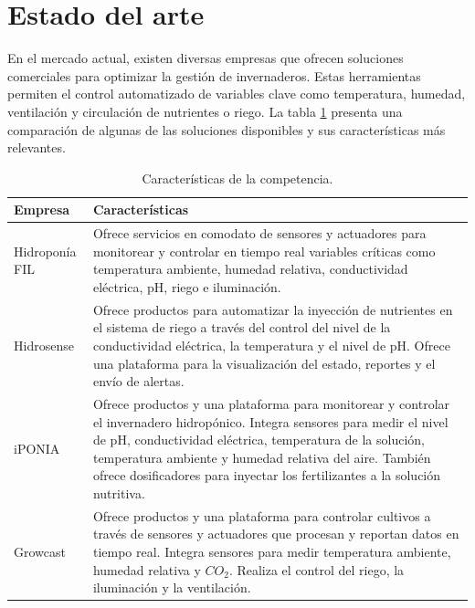 
\section{Estado del arte}

En el mercado actual, existen diversas empresas que ofrecen soluciones
comerciales para optimizar la gestión de invernaderos. Estas herramientas
permiten el control automatizado de variables clave como temperatura, humedad,
ventilación y circulación de nutrientes o riego. La tabla \ref{tab:competencia}
presenta una comparación de algunas de las soluciones disponibles y sus
características más relevantes.

\begin{table}[h]
      \centering
      \caption[Características de la competencia.]{Características de la competencia.}
      \begin{tabular}{p{3.2cm}p{9.6cm}}
            \toprule
            \textbf{Empresa}                                     & \textbf{Características}                                                         \\
            \midrule
            \multirow{1}{*}{Hidroponía FIL \cite{HidroponiaFIL}} & Ofrece servicios en comodato de sensores y actuadores
            para monitorear y controlar en tiempo real variables críticas como temperatura ambiente, humedad relativa, conductividad
            eléctrica, pH, riego e iluminación.                                                                                                     \\
            \multirow{1}{*}{Hidrosense \cite{Hidrosense}}        & Ofrece productos para automatizar la inyección de nutrientes en el sistema
            de riego a través del control del nivel de la conductividad eléctrica, la temperatura y el nivel de pH. Ofrece una plataforma para la
            visualización del estado, reportes y el envío de alertas.                                                                               \\
            \multirow{1}{*}{iPONIA \cite{iPonia}}                & Ofrece productos y una plataforma para monitorear y controlar el invernadero
            hidropónico. Integra sensores para medir el nivel de pH, conductividad eléctrica, temperatura de la solución, temperatura ambiente
            y humedad relativa del aire. También ofrece dosificadores para inyectar los fertilizantes a la solución nutritiva.                      \\
            \multirow{1}{*}{Growcast \cite{Growcast}}            & Ofrece productos y una plataforma para controlar cultivos a través de sensores y
            actuadores que procesan y reportan datos en tiempo real. Integra sensores para medir temperatura ambiente, humedad relativa y
            $CO_2$. Realiza el control del riego, la iluminación y la ventilación.                                                                  \\
            \bottomrule
            \hline
      \end{tabular}
      \label{tab:competencia}
\end{table}

